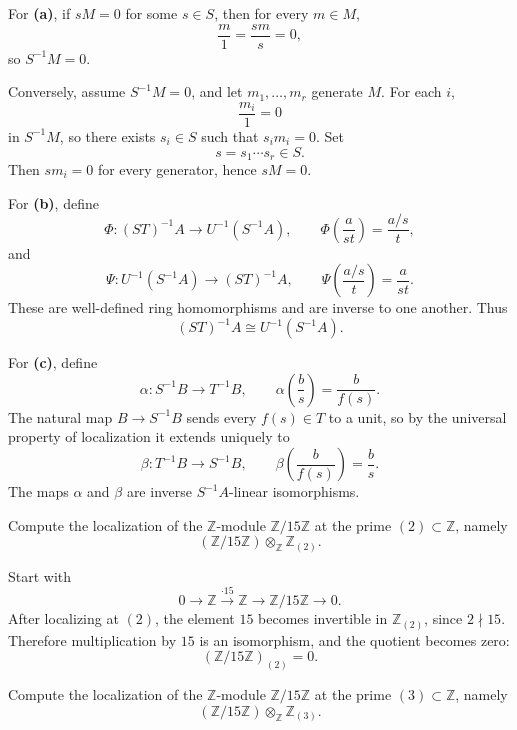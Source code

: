 \begin{solution}
For \textbf{(a)}, if \(sM=0\) for some \(s\in S\), then for every \(m\in M\),
\[
\frac{m}{1}=\frac{sm}{s}=0,
\]
so \(S^{-1}M=0\).

Conversely, assume \(S^{-1}M=0\), and let \(m_1,\dots,m_r\) generate \(M\).
For each \(i\),
\[
\frac{m_i}{1}=0
\]
in \(S^{-1}M\), so there exists \(s_i\in S\) such that \(s_i m_i=0\).
Set
\[
s=s_1\cdots s_r\in S.
\]
Then \(sm_i=0\) for every generator, hence \(sM=0\).

For \textbf{(b)}, define
\[
\Phi:(ST)^{-1}A\longrightarrow U^{-1}(S^{-1}A),
\qquad
\Phi\!\left(\frac{a}{st}\right)=\frac{a/s}{t},
\]
and
\[
\Psi:U^{-1}(S^{-1}A)\longrightarrow(ST)^{-1}A,
\qquad
\Psi\!\left(\frac{a/s}{t}\right)=\frac{a}{st}.
\]
These are well-defined ring homomorphisms and are inverse to one another. Thus
\[
(ST)^{-1}A\cong U^{-1}(S^{-1}A).
\]

For \textbf{(c)}, define
\[
\alpha:S^{-1}B\longrightarrow T^{-1}B,
\qquad
\alpha\!\left(\frac{b}{s}\right)=\frac{b}{f(s)}.
\]
The natural map \(B\to S^{-1}B\) sends every \(f(s)\in T\) to a unit, so by
the universal property of localization it extends uniquely to
\[
\beta:T^{-1}B\longrightarrow S^{-1}B,
\qquad
\beta\!\left(\frac{b}{f(s)}\right)=\frac{b}{s}.
\]
The maps \(\alpha\) and \(\beta\) are inverse \(S^{-1}A\)-linear
isomorphisms.
\end{solution}


\begin{problem}[CP-V-0080]
\label{prob:cp-v-0080}
Compute the localization of the \(\mathbb Z\)-module \(\mathbb Z/15\mathbb Z\) at the prime \((2)\subset\mathbb Z\), namely
\[
(\mathbb Z/15\mathbb Z)\otimes_{\mathbb Z}\mathbb Z_{(2)}.
\]
\end{problem}

\begin{solution}
Start with
\[
0 \longrightarrow \mathbb Z \xrightarrow{\cdot 15} \mathbb Z \longrightarrow \mathbb Z/15\mathbb Z \longrightarrow 0.
\]
After localizing at \((2)\), the element \(15\) becomes invertible in \(\mathbb Z_{(2)}\), since \(2\nmid 15\).
Therefore multiplication by \(15\) is an isomorphism, and the quotient becomes zero:
\[
(\mathbb Z/15\mathbb Z)_{(2)}=0.
\]
\end{solution}


\begin{problem}[CP-V-0081]
\label{prob:cp-v-0081}
Compute the localization of the \(\mathbb Z\)-module \(\mathbb Z/15\mathbb Z\) at the prime \((3)\subset\mathbb Z\), namely
\[
(\mathbb Z/15\mathbb Z)\otimes_{\mathbb Z}\mathbb Z_{(3)}.
\]
\end{problem}


